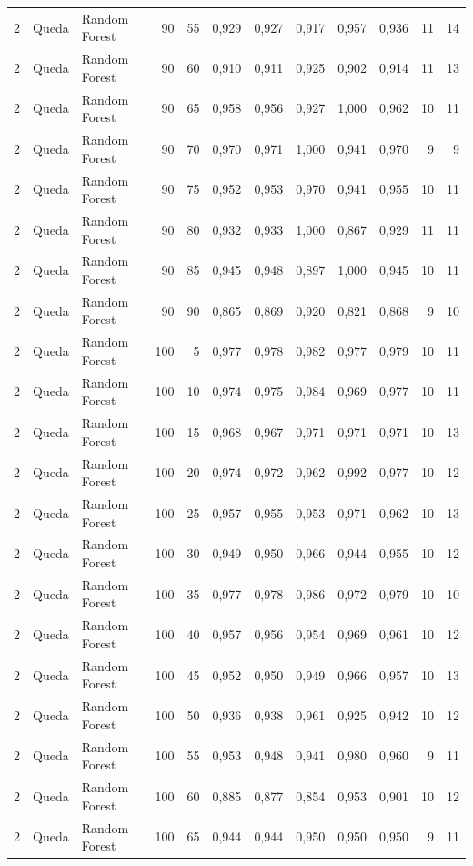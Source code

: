 \begin{longtable}{@{}rllrrrrrrrrr@{}}
2 & Queda & Random Forest & 90 & 55 & 0,929 & 0,927 & 0,917 & 0,957 & 0,936 & 11 & 14 \\
2 & Queda & Random Forest & 90 & 60 & 0,910 & 0,911 & 0,925 & 0,902 & 0,914 & 11 & 13 \\
2 & Queda & Random Forest & 90 & 65 & 0,958 & 0,956 & 0,927 & 1,000 & 0,962 & 10 & 11 \\
2 & Queda & Random Forest & 90 & 70 & 0,970 & 0,971 & 1,000 & 0,941 & 0,970 & 9 & 9 \\
2 & Queda & Random Forest & 90 & 75 & 0,952 & 0,953 & 0,970 & 0,941 & 0,955 & 10 & 11 \\
2 & Queda & Random Forest & 90 & 80 & 0,932 & 0,933 & 1,000 & 0,867 & 0,929 & 11 & 11 \\
2 & Queda & Random Forest & 90 & 85 & 0,945 & 0,948 & 0,897 & 1,000 & 0,945 & 10 & 11 \\
2 & Queda & Random Forest & 90 & 90 & 0,865 & 0,869 & 0,920 & 0,821 & 0,868 & 9 & 10 \\
2 & Queda & Random Forest & 100 & 5 & 0,977 & 0,978 & 0,982 & 0,977 & 0,979 & 10 & 11 \\
2 & Queda & Random Forest & 100 & 10 & 0,974 & 0,975 & 0,984 & 0,969 & 0,977 & 10 & 11 \\
2 & Queda & Random Forest & 100 & 15 & 0,968 & 0,967 & 0,971 & 0,971 & 0,971 & 10 & 13 \\
2 & Queda & Random Forest & 100 & 20 & 0,974 & 0,972 & 0,962 & 0,992 & 0,977 & 10 & 12 \\
2 & Queda & Random Forest & 100 & 25 & 0,957 & 0,955 & 0,953 & 0,971 & 0,962 & 10 & 13 \\
2 & Queda & Random Forest & 100 & 30 & 0,949 & 0,950 & 0,966 & 0,944 & 0,955 & 10 & 12 \\
2 & Queda & Random Forest & 100 & 35 & 0,977 & 0,978 & 0,986 & 0,972 & 0,979 & 10 & 10 \\
2 & Queda & Random Forest & 100 & 40 & 0,957 & 0,956 & 0,954 & 0,969 & 0,961 & 10 & 12 \\
2 & Queda & Random Forest & 100 & 45 & 0,952 & 0,950 & 0,949 & 0,966 & 0,957 & 10 & 13 \\
2 & Queda & Random Forest & 100 & 50 & 0,936 & 0,938 & 0,961 & 0,925 & 0,942 & 10 & 12 \\
2 & Queda & Random Forest & 100 & 55 & 0,953 & 0,948 & 0,941 & 0,980 & 0,960 & 9 & 11 \\
2 & Queda & Random Forest & 100 & 60 & 0,885 & 0,877 & 0,854 & 0,953 & 0,901 & 10 & 12 \\
2 & Queda & Random Forest & 100 & 65 & 0,944 & 0,944 & 0,950 & 0,950 & 0,950 & 9 & 11 \\

\end{longtable}
